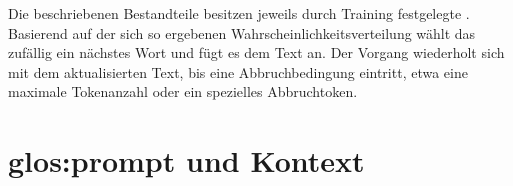 \documentclass[../main.tex]{subfiles}
\begin{document}
Die beschriebenen Bestandteile besitzen jeweils durch Training festgelegte . Basierend auf der sich so ergebenen Wahrscheinlichkeitsverteilung wählt das  zufällig ein nächstes Wort und fügt es dem Text an. Der Vorgang wiederholt sich mit dem aktualisierten Text, 
bis eine Abbruchbedingung eintritt, etwa eine maximale Tokenanzahl oder ein spezielles Abbruchtoken. \cite{architecture}\\


\section{\gls{glos:prompt} und Kontext}
\end{document}
